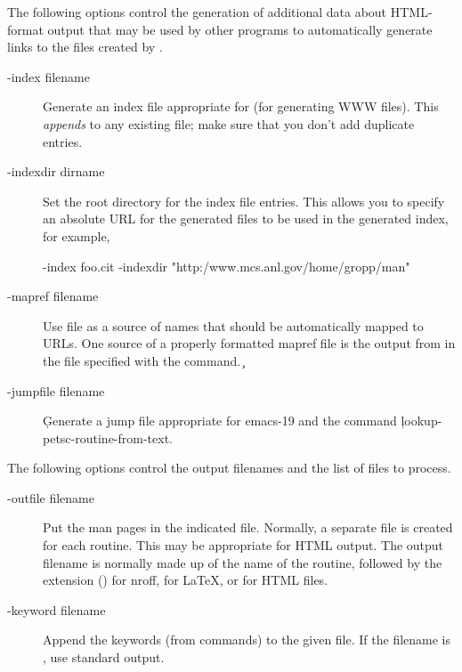 \documentclass[twoside]{linfoem}
\begin{document}
The following options control the generation of additional data about
HTML-format 
output that may be used by other programs to automatically generate links to
the files created by .
\begin{description}
\item[-index filename]
Generate an index file appropriate for  \cite{tohtml} (for
generating WWW files). 
This {\em appends} to any existing file; make sure that you don't add
duplicate entries.
\item[-indexdir dirname]
Set the root directory for the index file entries.  This allows you to 
specify an absolute URL for the generated files to be used in the generated
index,  for example, 
\begin{example}
-index foo.cit -indexdir "http:/www.mcs.anl.gov/home/gropp/man"
\end{example}
\item[-mapref filename]Use file  as a source of names that
  should be automatically mapped to URLs.  One source of a properly formatted
  mapref file is the output from  in the file specified with the
   command.
\c \item[-jumpfile filename]
\c Generate a jump file appropriate for emacs-19 and the command 
\c lookup-petsc-routine-from-text.  
\end{description}

The following options control the output filenames and the list of files to process.
\begin{description}
\item[-outfile filename]
Put the man pages in the indicated file.  Normally, a separate file is
created for each routine.  This may be appropriate for HTML output.
The output filename is normally made up of the name of the routine, followed
by the extension () for nroff,  for LaTeX, or
 for HTML files.
\item[-keyword filename]
Append the keywords (from  commands) to the given file.  If the
filename is \file{-}, use standard output.
\end{description}
\end{document}
